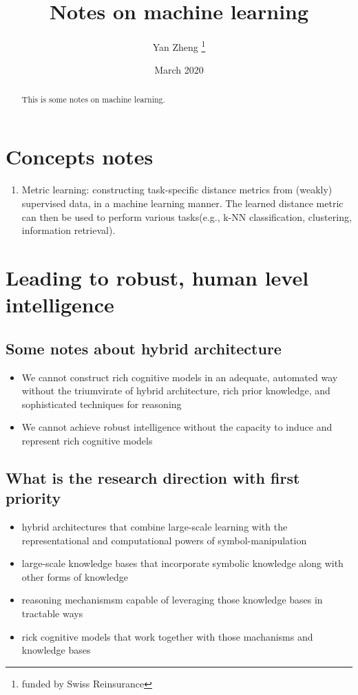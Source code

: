 \documentclass[12pt, letterpaper]{article}
\title{Notes on machine learning}
\author{Yan Zheng \thanks{funded by Swiss Reinsurance}}
\date{March 2020}
\begin{document}
\maketitle

\begin{abstract}
This is some notes on machine learning.
\end{abstract}

\section{Concepts notes}

\begin{enumerate}
	\item Metric learning: constructing task-specific distance metrics from (weakly) supervised data, in a machine learning manner. The learned distance metric can then be used to perform various tasks(e.g., k-NN classification, clustering, information retrieval).
\end{enumerate}

\newpage

\section{Leading to robust, human level intelligence}

\subsection{Some notes about hybrid architecture}
\begin{itemize}
	\item We cannot construct rich cognitive models in an adequate, automated way without
the triumvirate of hybrid architecture, rich prior knowledge, and sophisticated
techniques for reasoning
	\item We cannot achieve robust intelligence without the capacity to induce and represent rich cognitive models
\end{itemize}

\subsection{What is the research direction with first priority}
\begin{itemize}
	\item hybrid architectures that combine large-scale learning with the representational and computational powers of symbol-manipulation
	\item large-scale knowledge bases that incorporate symbolic knowledge along with other forms of knowledge
	\item reasoning mechanismsm capable of leveraging those knowledge bases in tractable ways
	\item rick cognitive models that work together with those machanisms and knowledge bases
\end{itemize}
\end{document}
